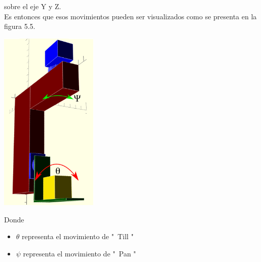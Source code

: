 sobre el eje Y y Z.\\
Es entonces que esos movimientos pueden ser visualizados como se presenta en la figura 5.5.
\begin{center}
	\includegraphics[width=0.35\textwidth]{Contenido/Cuerpo/Capitulo5/Fig15.eps}
	\label{Fig1}
\end{center}
Donde
\begin{itemize}
	\item $\theta$ representa el movimiento de "\ Till "
	\item $\psi$ representa el movimiento de "\ Pan  "
\end{itemize}

